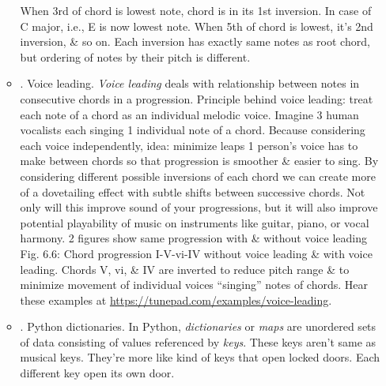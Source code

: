 \documentclass{article}
\begin{document}
\begin{itemize}
\begin{itemize}
		When 3rd of chord is lowest note, chord is in its 1st inversion. In case of C major, i.e., E is now lowest note. When 5th of chord is lowest, it's 2nd inversion, \& so on. Each inversion has exactly same notes as root chord, but ordering of notes by their pitch is different.
		\item {. Voice leading.} {\it Voice leading} deals with relationship between notes in consecutive chords in a progression. Principle behind voice leading: treat each note of a chord as an individual melodic voice. Imagine 3 human vocalists each singing 1 individual note of a chord. Because considering each voice independently, idea: minimize leaps 1 person's voice has to make between chords so that progression is smoother \& easier to sing. By considering different possible inversions of each chord we can create more of a dovetailing effect with subtle shifts between successive chords. Not only will this improve sound of your progressions, but it will also improve potential playability of music on instruments like guitar, piano, or vocal harmony. 2 figures show same progression with \& without voice leading {\sf Fig. 6.6: Chord progression I-V-vi-IV without voice leading \& with voice leading. Chords V, vi, \& IV are inverted to reduce pitch range \& to minimize movement of individual voices ``singing'' notes of chords.} Hear these examples at \url{https://tunepad.com/examples/voice-leading}.
		\item {. Python dictionaries.} In Python, {\it dictionaries} or {\it maps} are unordered sets of data consisting of values referenced by {\it keys}. These keys aren't same as musical keys. They're more like kind of keys that open locked doors. Each different key open its own door.
		

\end{itemize}
\end{itemize}
\end{document}
